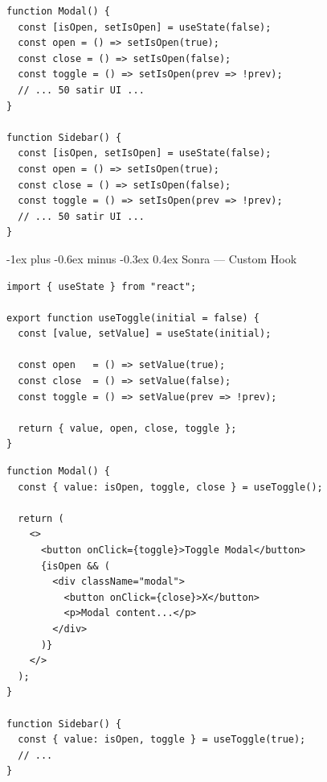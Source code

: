 \documentclass[12pt, a4paper]{article}
\makeatletter
\renewcommand{\subsubsection}{%
  \@startsection{subsubsection}{3}{\z@}%
    {-1ex plus -0.6ex minus -0.3ex}%
    {0.4ex}%
    {\normalfont\normalsize\bfseries\sffamily\color{accent}}%
}
\makeatother
\begin{document}
\begin{tcolorbox}[enhanced, colback=codebg, colframe=gray!30,
    colbacktitle=danger!85!black, coltitle=white, arc=4pt,
    title={\sffamily\bfseries\small \faTimes\ Aynı pattern her component'te}]
\begin{lstlisting}[style=jsxstyle]
function Modal() {
  const [isOpen, setIsOpen] = useState(false);
  const open = () => setIsOpen(true);
  const close = () => setIsOpen(false);
  const toggle = () => setIsOpen(prev => !prev);
  // ... 50 satir UI ...
}

function Sidebar() {
  const [isOpen, setIsOpen] = useState(false);
  const open = () => setIsOpen(true);
  const close = () => setIsOpen(false);
  const toggle = () => setIsOpen(prev => !prev);
  // ... 50 satir UI ...
}
\end{lstlisting}
\end{tcolorbox}

\vspace{6pt}

\subsubsection{Sonra --- Custom Hook}

\begin{tcolorbox}[enhanced, colback=codebg, colframe=gray!30,
    colbacktitle=accent!85!black, coltitle=white, arc=4pt,
    title={\sffamily\bfseries\small \faCheck\ useToggle.ts}]
\begin{lstlisting}[style=jsxstyle]
import { useState } from "react";

export function useToggle(initial = false) {
  const [value, setValue] = useState(initial);

  const open   = () => setValue(true);
  const close  = () => setValue(false);
  const toggle = () => setValue(prev => !prev);

  return { value, open, close, toggle };
}
\end{lstlisting}
\end{tcolorbox}

\vspace{4pt}

\begin{tcolorbox}[enhanced, colback=codebg, colframe=gray!30,
    colbacktitle=primary!85!black, coltitle=white, arc=4pt,
    title={\sffamily\bfseries\small Kullanım --- Tek Satırda}]
\begin{lstlisting}[style=jsxstyle]
function Modal() {
  const { value: isOpen, toggle, close } = useToggle();

  return (
    <>
      <button onClick={toggle}>Toggle Modal</button>
      {isOpen && (
        <div className="modal">
          <button onClick={close}>X</button>
          <p>Modal content...</p>
        </div>
      )}
    </>
  );
}

function Sidebar() {
  const { value: isOpen, toggle } = useToggle(true);
  // ...
}
\end{lstlisting}
\end{tcolorbox}
\end{document}
